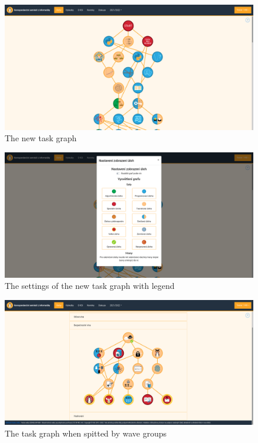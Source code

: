 \documentclass[
  digital, %
  oneside, %
  lof,     %
  lot,     %
]{fithesis4}
\begin{document}
{\begin{figure}
\includegraphics[width=\textwidth]{assets/img/graph_new}
\caption{The new task graph}
\label{fig:graph-new}
\end{figure}

\begin{figure}
\includegraphics[width=\textwidth]{assets/img/graph_newsettings}
\caption{The settings of the new task graph with legend}
\label{fig:graph-new-settings}
\end{figure}

\begin{figure}
\includegraphics[width=\textwidth]{assets/img/graph_split}
\caption{The task graph when spitted by wave groups}
\label{fig:graph-split}
\end{figure}

}
\end{document}
